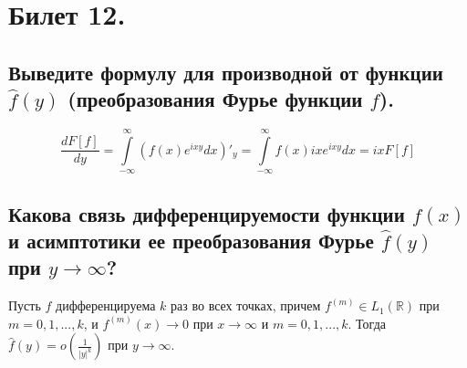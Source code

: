 \section{Билет 12.}

\subsection{Выведите формулу для производной от функции $\hat{f}(y)$ (преобразования Фурье функции $f$).}
\[
    \frac{d F[f]}{dy} = \int \limits_{-\infty}^{\infty} \left(
        f(x) e^{ixy} dx
    \right)'_y =
    \int \limits_{-\infty}^{\infty} f(x) ix e^{ixy} dx =
    ix F[f]
\]

\subsection{Какова связь дифференцируемости функции $f(x)$ и асимптотики ее преобразования Фурье $\hat{f}(y)$ при  $y \to \infty$?}
\begin{statement}
    Пусть $f$ дифференцируема $k$ раз во всех точках, причем $f^{(m)} \in L_1(\mathbb{R})$ при $m = 0,1,...,k$, и $f^{(m)}(x) \to 0$ при $x \to \infty$ и $m=0,1,...,k$. Тогда $\hat{f}(y) = o\left(
        \frac{1}{|y|^k}
    \right)$ при $y \to \infty$.
\end{statement}